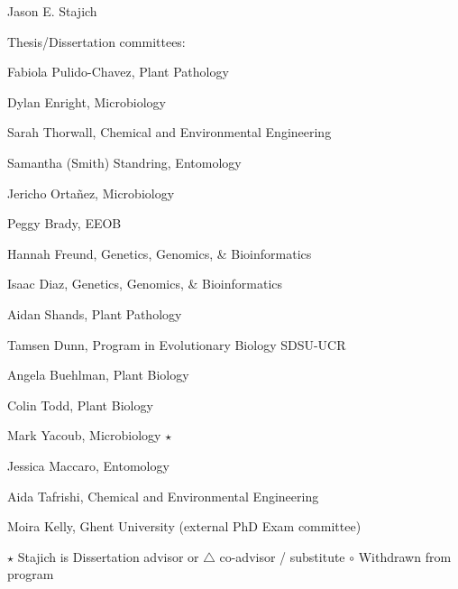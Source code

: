 \documentclass[10pt]{article}
\begin{document}
\begin{cv}{\centerline{Jason E. Stajich}}
\begin{cvlistcompact}{Thesis/Dissertation committees:}
\item Fabiola Pulido-Chavez, Plant Pathology
\item Dylan Enright, Microbiology
\item Sarah Thorwall, Chemical and Environmental Engineering
\item Samantha (Smith) Standring, Entomology
\item Jericho Orta\~{n}ez, Microbiology
\item Peggy Brady, EEOB
\item Hannah Freund, Genetics, Genomics, \& Bioinformatics
\item Isaac Diaz, Genetics, Genomics, \& Bioinformatics
\item Aidan Shands, Plant Pathology
\item Tamsen Dunn, Program in Evolutionary Biology SDSU-UCR
\item Angela Buehlman, Plant Biology
\item Colin Todd, Plant Biology
\item Mark Yacoub, Microbiology $\star$
\item Jessica Maccaro, Entomology
\item Aida Tafrishi, Chemical and Environmental Engineering
\item Moira Kelly, Ghent University (external PhD Exam committee)

\end{cvlistcompact}
$\star$ Stajich is Dissertation advisor or $\triangle$ co-advisor / substitute
$\circ$ Withdrawn from program


\end{cv}
\end{document}
